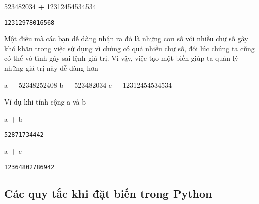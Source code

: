\documentclass[
]{book}
\newenvironment{Shaded}{\begin{snugshade}}{\end{snugshade}}
\newcommand{\DecValTok}[1]{\textcolor[rgb]{0.00,0.00,0.81}{#1}}
\newcommand{\NormalTok}[1]{#1}
\newcommand{\OperatorTok}[1]{\textcolor[rgb]{0.81,0.36,0.00}{\textbf{#1}}}
\begin{document}
\begin{Shaded}
\begin{Highlighting}[]
\DecValTok{523482034} \OperatorTok{+} \DecValTok{12312454534534}
\end{Highlighting}
\end{Shaded}

\begin{verbatim}
12312978016568
\end{verbatim}

Một điều mà các bạn dễ dàng nhận ra đó là những con số với nhiều chữ số gây khó khăn trong việc sử dụng vì chúng có quá nhiều chữ số, đôi lúc chúng ta cũng có thể vô tình gây sai lệnh giá trị. Vì vậy, việc tạo một biến giúp ta quản lý những giá trị này dễ dàng hơn

\begin{Shaded}
\begin{Highlighting}[]
\NormalTok{a }\OperatorTok{=} \DecValTok{52348252408}
\NormalTok{b }\OperatorTok{=} \DecValTok{523482034}
\NormalTok{c }\OperatorTok{=} \DecValTok{12312454534534}
\end{Highlighting}
\end{Shaded}

Ví dụ khi tính cộng a và b

\begin{Shaded}
\begin{Highlighting}[]
\NormalTok{a }\OperatorTok{+}\NormalTok{ b}
\end{Highlighting}
\end{Shaded}

\begin{verbatim}
52871734442
\end{verbatim}

\begin{Shaded}
\begin{Highlighting}[]
\NormalTok{a }\OperatorTok{+}\NormalTok{ c}
\end{Highlighting}
\end{Shaded}

\begin{verbatim}
12364802786942
\end{verbatim}

\hypertarget{cuxe1c-quy-tux1eafc-khi-ux111ux1eb7t-biux1ebfn-trong-python}{%
\subsection{Các quy tắc khi đặt biến trong Python}\label{cuxe1c-quy-tux1eafc-khi-ux111ux1eb7t-biux1ebfn-trong-python}}
\end{document}
